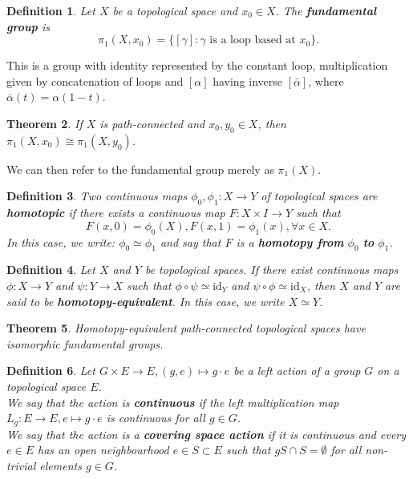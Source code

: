 \documentclass{article}
\newtheorem{theorem}{Theorem}[section]
\newtheorem{definition}[theorem]{Definition}
\begin{document}
\begin{definition}
Let $X$ be a topological space and $x_0\in X$. The \textbf{fundamental group} is \[\pi_1(X,x_0)=\{[\gamma]:\gamma\text{ is a loop based at }x_0\}.\]
\end{definition}
This is a group with identity represented by the constant loop, multiplication given by concatenation of loops and $[\alpha]$ having inverse $[\bar \alpha]$, where $\bar \alpha(t)=\alpha(1-t)$.

\begin{theorem}
If $X$ is path-connected and $x_0,y_0\in X$, then $\pi_1(X,x_0)\cong\pi_1(X,y_0)$.
\end{theorem}
We can then refer to the fundamental group merely as $\pi_1(X)$.

\begin{definition}
Two continuous maps $\phi_0,\phi_1\colon X\to Y$ of topological spaces are \textbf{homotopic} if there exists a continuous map $F\colon X\times I\to Y$ such that\[F(x,0)=\phi_0(X), F(x,1)=\phi_1(x),\forall x\in X.\]
In this case, we write: $\phi_0\simeq\phi_1$ and say that $F$ is a \textbf{homotopy from} $\phi_0$ \textbf{to} $\phi_1$.
\end{definition}



\begin{definition}
Let $X$ and $Y$ be topological spaces. If there exist continuous maps $\phi\colon X\to Y$ and $\psi\colon Y\to X$ such that $\phi\circ\psi\simeq\text{id}_Y$ and $\psi\circ\phi\simeq\text{id}_X$, then $X$ and $Y$ are said to be \textbf{homotopy-equivalent}. In this case, we write $X\simeq Y$.
\end{definition}

\begin{theorem}
Homotopy-equivalent path-connected topological spaces have isomorphic fundamental groups.
\end{theorem}

\begin{definition}
Let $G\times E\to E,(g,e)\mapsto g\cdot e$ be a left action of a group $G$ on a topological space $E$.\\
We say that the action is \textbf{continuous} if the left multiplication map $L_g\colon E\to E,e\mapsto g\cdot e$ is continuous for all $g\in G$.\\
We say that the action is a \textbf{covering space action} if it is continuous and every $e\in E$ has an open neighbourhood $e\in S\subset E$ such that $gS\cap S=\emptyset$ for all non-trivial elements $g\in G$.
\end{definition}
\end{document}
